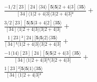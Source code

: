 \documentclass[varwidth, border=5pt]{standalone}
\begin{document}
\begin{my}
$\begin{gathered}
\scriptscriptstyle\frac{-1/2[23][24]⟨34⟩[𝟓|𝟓|2+4|3]⟨3𝟓⟩}{[34]⟨1|2+4|3]⟨3|2+4|3]²} +\\
\scriptscriptstyle\frac{3/2[23][𝟓|𝟓|3+4|2]⟨3𝟓⟩}{[34]⟨1|2+4|3]⟨3|2+4|3]} +\\
\scriptscriptstyle\frac{1[23]²[24][𝟓|𝟓|2⟩⟨3𝟓⟩}{[34]²⟨1|2+4|3]⟨3|2+4|3]} +\\
\scriptscriptstyle\frac{-1⟨14⟩[23][24][𝟓|𝟓|2+4|3]⟨3𝟓⟩}{[34]⟨1|2+4|3]²⟨3|2+4|3]} +\\
\scriptscriptstyle\frac{1[23]²[𝟓|𝟓|1⟩⟨3𝟓⟩}{[34]⟨1|2+4|3]²} \phantom{+}
\end{gathered}$
\end{my}
\end{document}
